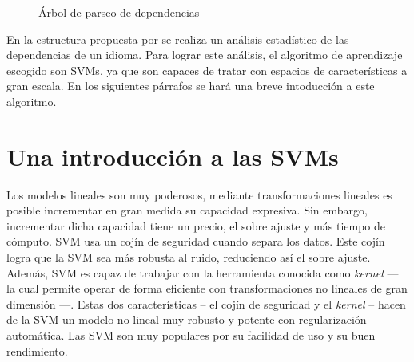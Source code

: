 \begin{figure}[th]
  \scriptsize
   \caption{Árbol de parseo de dependencias}
   \label{fig:deptree}
\end{figure}

En la estructura propuesta por \citeauthor{yamada2003} se realiza un análisis
estadístico de las dependencias de un idioma. Para lograr este análisis, el
algoritmo de aprendizaje escogido son \acp{SVM}, ya que son capaces de tratar
con espacios de características a gran escala. En los siguientes párrafos se
hará una breve intoducción a este algoritmo.

\section{Una introducción a las SVMs}
\label{subsec:svmintro}

\nocite{yaser2012} Los modelos lineales son muy poderosos, mediante
transformaciones lineales es posible incrementar en gran medida su capacidad
expresiva. Sin embargo, incrementar dicha capacidad tiene un precio, el sobre
ajuste y más tiempo de cómputo. \ac{SVM} usa un cojín de seguridad cuando separa
los datos. Este cojín logra que la \ac{SVM} sea más robusta al ruido, reduciendo
así el sobre ajuste. Además, \ac{SVM} es capaz de trabajar con la herramienta
conocida como \emph{kernel} --- la cual permite operar de forma eficiente con
transformaciones no lineales de gran dimensión ---. Estas dos características --
el cojín de seguridad y el \emph{kernel} -- hacen de la \ac{SVM} un modelo no
lineal muy robusto y potente con regularización automática. Las \ac{SVM} son muy
populares por su facilidad de uso y su buen rendimiento.

